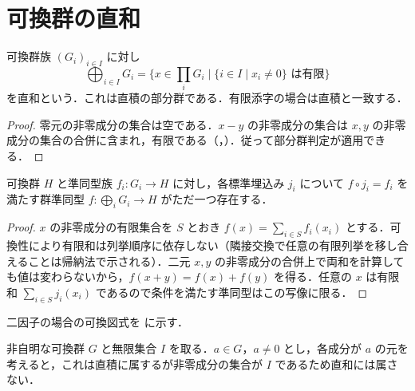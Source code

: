 \section{可換群の直和}
\begin{defn}[可換群の直和]
可換群族 $(G_i)_{i\in I}$ に対し
\[
 \bigoplus_{i\in I}G_i=\{x\in\prod_iG_i\mid
 \{i\in I\mid x_i\ne0\}\text{ は有限}\}
\]
を直和という．これは直積の部分群である．有限添字の場合は直積と一致する．
\end{defn}
\begin{proof}
零元の非零成分の集合は空である．$x-y$ の非零成分の集合は $x,y$ の非零成分の集合の合併に含まれ，有限である（，）．従って部分群判定が適用できる．
\end{proof}
\begin{prop}[直和の普遍性]
可換群 $H$ と準同型族 $f_i:G_i\to H$ に対し，各標準埋込み $j_i$ について $f\circ j_i=f_i$ を満たす群準同型 $f:\bigoplus_i G_i\to H$ がただ一つ存在する．
\end{prop}
\begin{proof}
$x$ の非零成分の有限集合を $S$ とおき $f(x)=\sum_{i\in S}f_i(x_i)$ とする．可換性により有限和は列挙順序に依存しない（隣接交換で任意の有限列挙を移し合えることは帰納法で示される）．二元 $x,y$ の非零成分の合併上で両和を計算しても値は変わらないから，$f(x+y)=f(x)+f(y)$ を得る．任意の $x$ は有限和 $\sum_{i\in S}j_i(x_i)$ であるので条件を満たす準同型はこの写像に限る．
\end{proof}
二因子の場合の可換図式を  に示す．
\begin{prop}[無限直積と直和の相違]
非自明な可換群 $G$ と無限集合 $I$ を取る．$a\in G$，$a\ne0$ とし，各成分が $a$ の元を考えると，これは直積に属するが非零成分の集合が $I$ であるため直和には属さない．
\end{prop}
